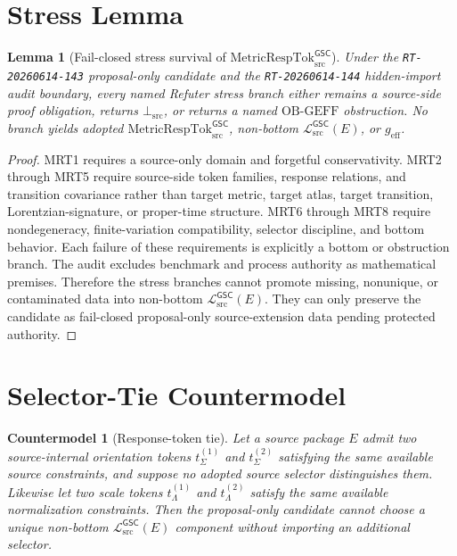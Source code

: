 \documentclass[11pt]{article}
\newcommand{\MetricRespTok}{\mathrm{MetricRespTok}_{\mathrm{src}}^{\mathsf{GSC}}}
\newcommand{\MetricData}{\mathcal{L}_{\mathrm{src}}^{\mathsf{GSC}}}
\newcommand{\BottomSrc}{\bot_{\mathrm{src}}}
\newcommand{\OBGEFF}{\mathrm{OB\mbox{-}GEFF}}
\newcommand{\geff}{g_{\mathrm{eff}}}
\newtheorem{lemma}{Lemma}
\newtheorem{countermodel}{Countermodel}
\begin{document}
\section{Stress Lemma}

\begin{lemma}[Fail-closed stress survival of \(\MetricRespTok\)]
Under the \texttt{RT-20260614-143} proposal-only candidate and the
\texttt{RT-20260614-144} hidden-import audit boundary, every named Refuter
stress branch either remains a source-side proof obligation, returns
\(\BottomSrc\), or returns a named \(\OBGEFF\) obstruction. No branch yields
adopted \(\MetricRespTok\), non-bottom \(\MetricData(E)\), or \(\geff\).
\end{lemma}

\begin{proof}
MRT1 requires a source-only domain and forgetful conservativity. MRT2 through
MRT5 require source-side token families, response relations, and transition
covariance rather than target metric, target atlas, target transition,
Lorentzian-signature, or proper-time structure. MRT6 through MRT8 require
nondegeneracy, finite-variation compatibility, selector discipline, and bottom
behavior. Each failure of these requirements is explicitly a bottom or
obstruction branch. The audit excludes benchmark and process authority as
mathematical premises. Therefore the stress branches cannot promote missing,
nonunique, or contaminated data into non-bottom \(\MetricData(E)\). They can
only preserve the candidate as fail-closed proposal-only source-extension data
pending protected authority.
\end{proof}

\section{Selector-Tie Countermodel}

\begin{countermodel}[Response-token tie]
Let a source package \(E\) admit two source-internal orientation tokens
\(t_{\Sigma}^{(1)}\) and \(t_{\Sigma}^{(2)}\) satisfying the same available
source constraints, and suppose no adopted source selector distinguishes them.
Likewise let two scale tokens \(t_{\Lambda}^{(1)}\) and
\(t_{\Lambda}^{(2)}\) satisfy the same available normalization constraints.
Then the proposal-only candidate cannot choose a unique non-bottom
\(\MetricData(E)\) component without importing an additional selector.
\end{countermodel}
\end{document}
